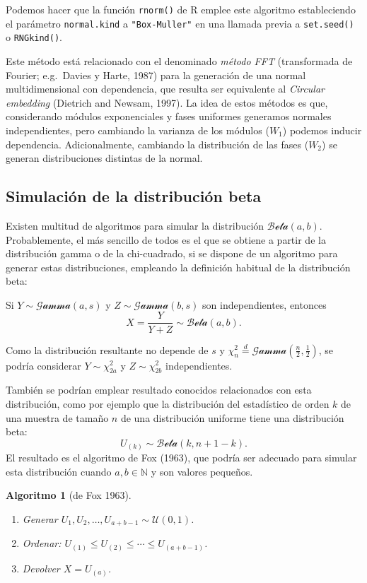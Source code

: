 \documentclass[
]{book}
\theoremstyle{break}
\newtheorem{conjecture}{Algoritmo}[chapter]
\theoremstyle{nonumberplain}
\begin{document}
Podemos hacer que la función \texttt{rnorm()} de R emplee este algoritmo estableciendo el parámetro \texttt{normal.kind} a \texttt{"Box-Muller"} en una llamada previa a \texttt{set.seed()} o \texttt{RNGkind()}.

Este método está relacionado con el denominado \emph{método FFT} (transformada de Fourier; e.g.~Davies y Harte, 1987) para la generación de una normal multidimensional con dependencia, que resulta ser equivalente al \emph{Circular embedding} (Dietrich and Newsam, 1997).
La idea de estos métodos es que, considerando módulos exponenciales y fases uniformes generamos normales independientes, pero cambiando la varianza de los módulos (\(W_1\)) podemos inducir dependencia.
Adicionalmente, cambiando la distribución de las fases (\(W_2\)) se generan distribuciones distintas de la normal.

\hypertarget{simulaciuxf3n-de-la-distribuciuxf3n-beta}{%
\subsection{Simulación de la distribución beta}\label{simulaciuxf3n-de-la-distribuciuxf3n-beta}}

Existen multitud de algoritmos para simular la distribución \(\mathcal{Beta}(a, b)\).
Probablemente, el más sencillo de todos es el que se obtiene a partir de la distribución gamma o de la chi-cuadrado, si se dispone de un algoritmo para generar estas distribuciones, empleando la definición habitual de la distribución beta:

Si \(Y \sim \mathcal{Gamma}(a, s)\) y \(Z \sim \mathcal{Gamma}(b, s)\) son independientes, entonces \[X=\frac{Y}{Y+Z} \sim \mathcal{Beta}(a, b).\]

Como la distribución resultante no depende de \(s\) y \(\chi^2_{n} \overset{d}{=} \mathcal{Gamma}\left(\tfrac{n}{2}, \tfrac{1}{2}\right)\), se podría considerar \(Y \sim \chi^2_{2a}\) y \(Z \sim \chi^2_{2b}\) independientes.

También se podrían emplear resultado conocidos relacionados con esta distribución, como por ejemplo que la distribución del estadístico de orden \(k\) de una muestra de tamaño \(n\) de una distribución uniforme tiene una distribución beta:
\[U_{(k)} \sim \mathcal{Beta}(k,n+1-k).\]
El resultado es el algoritmo de Fox (1963), que podría ser adecuado para simular esta distribución cuando \(a, b \in \mathbb{N}\) y son valores pequeños.

\begin{conjecture}[de Fox 1963]
\protect\hypertarget{cnj:fox}{}\label{cnj:fox}

\begin{enumerate}
\def\labelenumi{\arabic{enumi}.}
\item
  Generar \(U_1, U_2, \ldots, U_{a+b-1} \sim \mathcal{U}(0, 1)\).
\item
  Ordenar: \(U_{(1)}\leq U_{(2)}\leq\cdots\leq U_{(a+b-1)}\).
\item
  Devolver \(X=U_{(a)}\).
\end{enumerate}

\end{conjecture}
\end{document}
